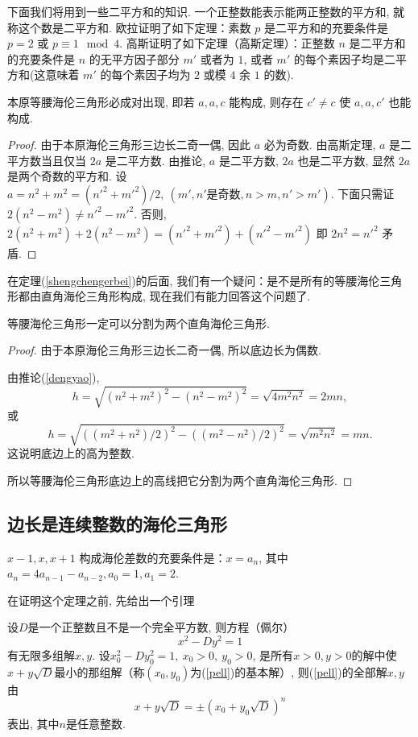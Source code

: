 \documentclass[12pt]{article}
\begin{document}
下面我们将用到一些二平方和的知识. 一个正整数能表示能两正整数的平方和, 就称这个数是二平方和. 欧拉证明了如下定理：素数 $p$ 是二平方和的充要条件是 $p=2$ 或 $p\equiv1\mod4$. 高斯证明了如下定理（高斯定理）：正整数 $n$ 是二平方和的充要条件是 $n$ 的无平方因子部分 $m'$ 或者为 $1$, 或者 $m'$ 的每个素因子均是二平方和(这意味着 $m'$ 的每个素因子均为 $2$ 或模 $4$ 余 $1$ 的数).  

\begin{theorem}
     本原等腰海伦三角形必成对出现, 即若 $a,a,c$ 能构成, 则存在 $c'\neq c$ 使 $a,a,c'$ 也能构成. 
\end{theorem}
\begin{proof}
     由于本原海伦三角形三边长二奇一偶, 因此 $a$ 必为奇数. 由高斯定理, $a$ 是二平方数当且仅当 $2a$ 是二平方数. 由推论, $a$ 是二平方数, $2a$ 也是二平方数, 显然 $2a$ 是两个奇数的平方和. 设 $a=n^2+m^2=(n'^2+m'^2)/2,\ (m',n'\text{是奇数},n>m,n'>m')$. 下面只需证 $2(n^2-m^2)\neq n'^2-m'^2$. 否则, $2(n^2+m^2)+2(n^2-m^2)=(n'^2+m'^2)+(n'^2-m'^2)$ 即 $2n^2=n'^2$ 矛盾. 
\end{proof}

在定理(\ref{shengchengerbei})的后面, 我们有一个疑问：是不是所有的等腰海伦三角形都由直角海伦三角形构成, 现在我们有能力回答这个问题了. 
\begin{theorem}
    等腰海伦三角形一定可以分割为两个直角海伦三角形. 
\end{theorem}
\begin{proof}
    由于本原海伦三角形三边长二奇一偶, 所以底边长为偶数. \par
    由推论(\ref{dengyao}), 
    \[h=\sqrt{(n^2+m^2)^2-(n^2-m^2)^2}=\sqrt{4m^2n^2}=2mn,\]
    或
    \[h=\sqrt{((m^2+n^2)/2)^2-((m^2-n^2)/2)^2}=\sqrt{m^2n^2}=mn.\]
    这说明底边上的高为整数. \par
    所以等腰海伦三角形底边上的高线把它分割为两个直角海伦三角形. 
\end{proof}


\subsection{边长是连续整数的海伦三角形}
\begin{theorem}\label{lianxu}
    $x-1,x,x+1$ 构成海伦差数的充要条件是：$x=a_n$, 其中 $a_n=4a_{n-1}-a_{n-2},a_0=1,a_1=2$.
\end{theorem}

在证明这个定理之前, 先给出一个引理

\begin{lemma}
    设$D$是一个正整数且不是一个完全平方数, 则方程（佩尔）
    \begin{equation}\label{pell}
        x^2-Dy^2=1
    \end{equation}
    有无限多组解$x,y$. 设$x_0^2-Dy_0^2=1,\ x_0>0,\ y_0>0$, 是所有$x>0,y>0$的解中使$x+y\sqrt D$最小的那组解（称$(x_0,y_0)$为(\ref{pell})的基本解）, 则(\ref{pell})的全部解$x,y$ 由
    \begin{equation}\label{pellkey}
        x+y\sqrt D=\pm(x_0+y_0\sqrt D)^n
    \end{equation}
    表出, 其中$n$是任意整数. 
\end{lemma}
\end{document}
